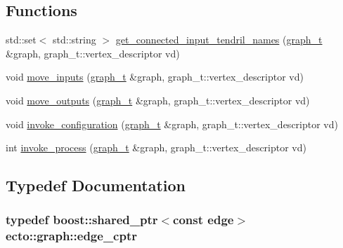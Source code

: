 \subsection*{Functions}
\begin{DoxyCompactItemize}
\item 
std\+::set$<$ std\+::string $>$ \hyperlink{namespaceecto_1_1graph_a3313c6217262c9d746a5f80d0a4708d7}{get\+\_\+connected\+\_\+input\+\_\+tendril\+\_\+names} (\hyperlink{structecto_1_1graph_1_1graph__t}{graph\+\_\+t} \&graph, graph\+\_\+t\+::vertex\+\_\+descriptor vd)
\item 
void \hyperlink{namespaceecto_1_1graph_a6a06bfc5757345d0a4531988e8125197}{move\+\_\+inputs} (\hyperlink{structecto_1_1graph_1_1graph__t}{graph\+\_\+t} \&graph, graph\+\_\+t\+::vertex\+\_\+descriptor vd)
\item 
void \hyperlink{namespaceecto_1_1graph_a540b97ac69ca6f09dfe9a60e1ebd5a1e}{move\+\_\+outputs} (\hyperlink{structecto_1_1graph_1_1graph__t}{graph\+\_\+t} \&graph, graph\+\_\+t\+::vertex\+\_\+descriptor vd)
\item 
void \hyperlink{namespaceecto_1_1graph_a13df50b98a1c4fe0d35ce7a3ea7316e1}{invoke\+\_\+configuration} (\hyperlink{structecto_1_1graph_1_1graph__t}{graph\+\_\+t} \&graph, graph\+\_\+t\+::vertex\+\_\+descriptor vd)
\item 
int \hyperlink{namespaceecto_1_1graph_a0b293971d5460ed370597d2e7c5d0b9c}{invoke\+\_\+process} (\hyperlink{structecto_1_1graph_1_1graph__t}{graph\+\_\+t} \&graph, graph\+\_\+t\+::vertex\+\_\+descriptor vd)
\end{DoxyCompactItemize}


\subsection{Typedef Documentation}
\hypertarget{namespaceecto_1_1graph_ac45fa43674f9071675a1ebbf4d021eb4}{}
\subsubsection[{edge\+\_\+cptr}]{\setlength{\rightskip}{0pt plus 5cm}typedef boost\+::shared\+\_\+ptr$<$const {\bf edge}$>$ {\bf ecto\+::graph\+::edge\+\_\+cptr}}\label{namespaceecto_1_1graph_ac45fa43674f9071675a1ebbf4d021eb4}
\hypertarget{namespaceecto_1_1graph_ad6da390ef18395607e6eab139f37fcf4}{}
